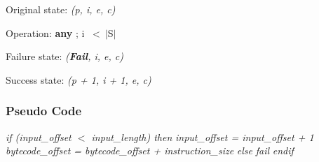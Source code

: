 Original state: \textit{(p, i, e, c)}

Operation: \textbf{any} ; i \ \textless \ $\vert$S$\vert$

Failure state: \textit{(\textbf{Fail}, i, e, c)}

Success state: \textit{(p + 1, i + 1, e, c)}

\subsubsection{Pseudo Code}

\begin{myquote}
\textit{if (input\_offset $<$ input\_length) then} \newline
\hspace*{10mm} \textit{input\_offset = input\_offset + 1} \newline
\hspace*{10mm} \textit{bytecode\_offset = bytecode\_offset + instruction\_size} \newline
\textit{else} \newline
\hspace*{10mm} \textit{fail} \newline
\textit{endif}
\end{myquote}
